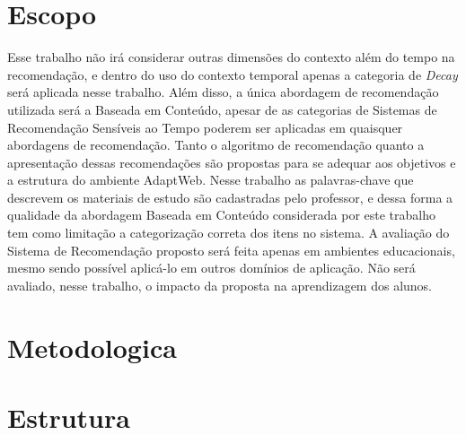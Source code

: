 \section{Escopo}

Esse trabalho não irá considerar outras dimensões do contexto além do tempo na recomendação, e dentro do uso do contexto
temporal apenas a categoria de \textit{Decay} será aplicada nesse trabalho. Além disso, a única abordagem de recomendação
utilizada será a Baseada em Conteúdo, apesar de as categorias de Sistemas de Recomendação Sensíveis ao Tempo poderem ser
aplicadas em quaisquer abordagens de recomendação. Tanto o algoritmo de recomendação quanto a apresentação dessas
recomendações são propostas para se adequar aos objetivos e a estrutura do ambiente AdaptWeb\textsuperscript{\textregistered}.
Nesse trabalho as palavras-chave que descrevem os materiais de estudo são cadastradas pelo professor, e dessa forma a
qualidade da abordagem Baseada em Conteúdo considerada por este trabalho tem como limitação a categorização correta dos
itens no sistema. A avaliação do Sistema de Recomendação proposto será feita apenas em ambientes educacionais, mesmo sendo
possível aplicá-lo em outros domínios de aplicação. Não será avaliado, nesse trabalho, o impacto da proposta na aprendizagem
dos alunos.

\section{Metodologica}

\section{Estrutura}



